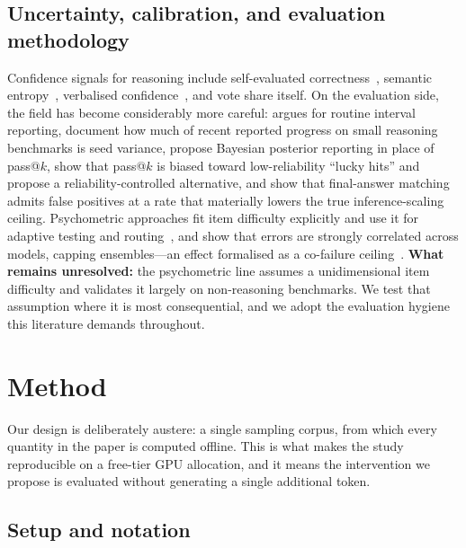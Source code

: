 \subsection{Uncertainty, calibration, and evaluation methodology}

Confidence signals for reasoning include self-evaluated
correctness~\citep{kadavath2022know}, semantic
entropy~\citep{kuhn2023semantic,farquhar2024semantic}, verbalised
confidence~\citep{lin2022teaching,tian2023just}, and vote share itself. On the
evaluation side, the field has become considerably more careful:
\citet{miller2024errorbars} argues for routine interval reporting,
\citet{hochlehnert2025sober} document how much of recent reported progress on
small reasoning benchmarks is seed variance, \citet{dontpassk2025} propose
Bayesian posterior reporting in place of pass@$k$,
\citet{coverattau2025} show that pass@$k$ is biased toward low-reliability
``lucky hits'' and propose a reliability-controlled alternative, and
\citet{falsepositives2025} show that final-answer matching admits false
positives at a rate that materially lowers the true inference-scaling ceiling.
Psychometric approaches fit item difficulty explicitly and use it for adaptive
testing and routing~\citep{atlas2025,irtnet2025,irtrouter2025,psnirt2026}, and
\citet{kim2025correlated} show that errors are strongly correlated across
models, capping ensembles---an effect formalised as a co-failure
ceiling~\citep{cofailure2026}. \textbf{What remains unresolved:} the
psychometric line assumes a unidimensional item difficulty and validates it
largely on non-reasoning benchmarks. We test that assumption where it is most
consequential, and we adopt the evaluation hygiene this literature demands
throughout.

\section{Method}
\label{sec:method}

Our design is deliberately austere: a single sampling corpus, from which every
quantity in the paper is computed offline. This is what makes the study
reproducible on a free-tier GPU allocation, and it means the intervention we
propose is evaluated without generating a single additional token.

\subsection{Setup and notation}


